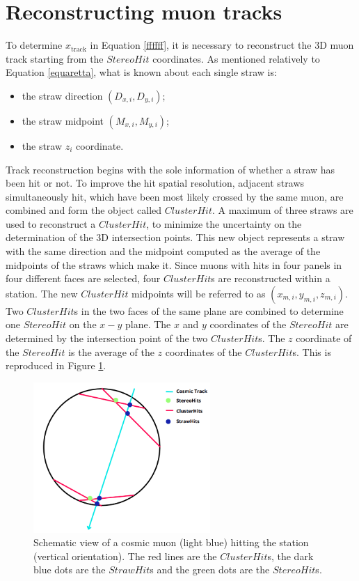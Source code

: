 \section{Reconstructing muon tracks}\label{reconstruction}
To determine $x_{\text{track}}$ in Equation \ref{ffffff}, 
it is necessary to reconstruct the 3D muon track 
starting from the $StereoHit$ coordinates.
As mentioned relatively to Equation \ref{equaretta}, 
what is known about each single straw is:
\begin{itemize}
    \item the straw direction $(D_{x,i},D_{y,i})$;
    \item the straw midpoint $(M_{x,i},M_{y,i})$;
    \item the straw $z_i$ coordinate.
\end{itemize} 
Track reconstruction begins 
with the sole information of whether 
a straw has been hit or not.
To improve the hit spatial resolution, adjacent 
straws simultaneously hit, which have been most 
likely crossed by the same muon, are combined 
and form the object called $ClusterHit$. 
A maximum of three straws are used to reconstruct a 
$ClusterHit$, to minimize the uncertainty on 
the determination of the 3D intersection points.
This new object represents a 
straw with the same direction and the midpoint 
computed as the average of the midpoints of the straws  
which make it. Since muons with hits in four panels in four different 
faces are selected, four $ClusterHit$s are reconstructed 
within a station. The new $ClusterHit$ 
midpoints will be referred to as 
$(x_{m,i}, y_{m,i}, z_{m,i})$.
Two $ClusterHit$s in the two faces of the same 
plane are combined to determine one $StereoHit$ on 
the $x-y$ plane. 
The $x$ and $y$ coordinates of the 
$StereoHit$ are determined by the 
intersection point of the two 
$ClusterHit$s. The $z$ coordinate of 
the $StereoHit$ is the average of the 
$z$ coordinates of the $ClusterHit$s.
This is reproduced in Figure \ref{fig:stco}.
\begin{figure}[!h]
    \centering
    \includegraphics[width =0.6\textwidth]{figures/png/Screenshot_20240810_210144.png}
    \caption[Schematic view of a cosmic muon hitting the vertical 
    oriented station.]{Schematic 
    view of a cosmic muon (light blue) hitting the station 
    (vertical orientation). The red lines are the $ClusterHit$s, 
    the dark blue dots 
    are the $StrawHit$s and the green dots are the $StereoHit$s.}
    \label{fig:stco}
\end{figure}
